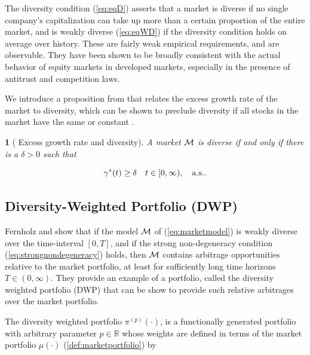 \documentclass[british]{amsart} \usepackage{lmodern}
\numberwithin{equation}{section} \numberwithin{figure}{section}
\theoremstyle{plain} \newtheorem{thm}{\protect\theoremname}[section]
\theoremstyle{definition} \newtheorem{defn}[thm]{\protect\definitionname}
\theoremstyle{plain} \newtheorem{assumption}[thm]{\protect\assumptionname}
\theoremstyle{plain} \newtheorem{lem}[thm]{\protect\lemmaname}
\theoremstyle{plain} \newtheorem{prop}[thm]{\protect\propositionname}
\theoremstyle{remark} \newtheorem{rem}[thm]{\protect\remarkname}
\theoremstyle{plain} \newtheorem{cor}[thm]{\protect\corollaryname}
\begin{document}
The diversity condition (\ref{eq:eqD}) asserts that a market is diverse if no
single company's capitalization can take up more than a certain proportion of
the entire market, and is weakly diverse (\ref{eq:eqWD}) if the diversity
condition holds on average over history. These are fairly weak empirical
requirements, and are observable. They have been shown to be broadly consistent
 with the actual behavior of equity markets in developed markets, especially 
in the presence of antitrust and competition laws.

We introduce a proposition from \cite{fernholz1999diversity} that relates the
excess growth rate of the market to diversity, which can be shown to preclude
diversity if all stocks in the market have the same {\cite[Corollary
3.1]{fernholz1999diversity}} or constant {\cite[Corollary
3.2]{fernholz1999diversity}}.

\begin{prop}
[
  {\cite[Proposition 3.1]{fernholz1999diversity}}
  Excess growth rate and diversity
]
  A market $\mathcal{M}$ is diverse if and only if there is a $\delta > 0$ such that

  \begin{equation}
      \gamma^{*}(t) \ge \delta
      \quad t\in[0,\infty),
      \quad \text{a.s.}.
  \end{equation}

\end{prop}

\newpage
\subsection{Diversity-Weighted Portfolio (DWP)}

Fernholz \cite{fernholz1999diversity} and \cite{fernholz2009} show that if the
model $\mathcal{M}$ of (\ref{eq:marketmodel}) is weakly diverse over the
time-interval $[0,T]$, and if the strong non-degeneracy condition
(\ref{eq:strongnondegeneracy}) holds, then $\mathcal{M}$ contains arbitrage
opportunities relative to the market portfolio, at least for sufficiently long
time horizons $T \in (0,\infty)$. They provide an example of a portfolio, called
the diversity weighted portfolio (DWP) that can be show to provide such relative
arbitrages over the market portfolio.

The diversity weighted portfolio $\pi^{(p)}(\cdot)$, is a functionally generated
portfolio with arbitrary parameter $p\in\mathbb{R}$ whose weights are defined 
in terms of the market portfolio $\mu(\cdot)$ (\ref{def:marketportfolio}) by
\end{document}
